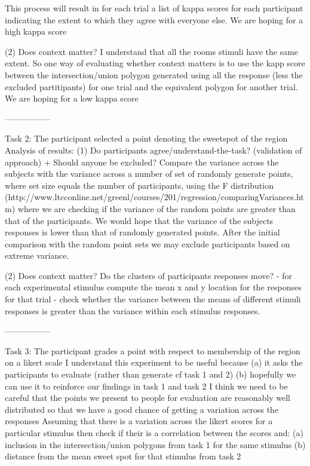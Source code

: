 \documentclass[11pt,letterpaper]{article}
\begin{document}
This process will result in for each trial a list of kappa scores for each participant indicating the extent to which they agree with everyone else. We are hoping for a high kappa score

(2) Does context matter?
I understand that all the rooms stimuli have the same extent.
So one way of evaluating whether context matters is to use the kapp score between the intersection/union polygon generated using all the response (less the excluded partitipants) for one trial and the equivalent polygon for another trial.
We are hoping for a low kappa score

-----------------

Task 2: The participant selected a point denoting the sweetspot of the region
Analysis of results:
(1) Do participants agree/understand-the-task? (validation of approach) + Should anyone be excluded?
Compare the variance across the subjects with the variance across a number of set of randomly generate points, where set size equals the number of participants, using the F distribution (http://www.ltcconline.net/greenl/courses/201/regression/comparingVariances.htm) where we are checking if the variance of the random points are greater than that of the participants.
We would hope that the variance of the subjects responses is lower than that of randomly generated points.
After the initial comparison with the random point sets we may exclude participants based on extreme variance.
 
(2) Does context matter?
Do the clusters of participants responses move?
- for each experimental stimulus compute the mean x and y location for the responses for that trial
- check whether the variance between the means of different stimuli responses is greater than the variance within each stimulus responses.

-----------------


Task 3: The participant grades a point with respect to membership of the region on a likert scale
I understand this experiment to be useful because (a) it asks the participants to evaluate (rather than generate cf task 1 and 2) (b) hopefully we can use it to reinforce our findings in task 1 and task 2
I think we need to be careful that the points we present to people for evaluation are reasonably well distributed so that we have a good chance of getting a variation across the responses
Assuming that there is a variation across the likert scores for a particular stimulus then check if their is a correlation between the scores and:
(a) inclusion in the intersection/union polygons from task 1 for the same stimulus
(b) distance from the mean sweet spot for that stimulus from task 2
\end{document}
